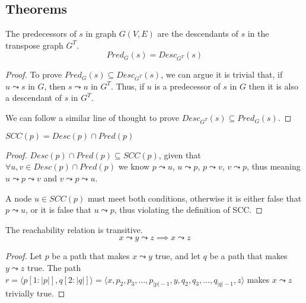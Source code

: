 \subsection{Theorems}
\begin{theorem}
    The predecessors of $s$ in graph $G(V,E)$ are the descendants of $s$ in the transpose graph $G^T$.
    \begin{equation*}
        Pred_{G}(s)=Desc_{G^T}(s)
    \end{equation*}
\end{theorem}
\begin{proof}
    To prove $Pred_G(s) \subseteq Desc_{G^T}(s)$, we can argue it is trivial that, if $u \leadsto s$ in $G$, then $s \leadsto u$ in $G^T$. Thus, if $u$ is a predecessor of $s$ in $G$ then it is also a descendant of $s$ in $G^T$.\par
    We can follow a similar line of thought to prove $Desc_{G^T}(s) \subseteq Pred_G(s)$.
\end{proof}
\begin{theorem} \label{teor:scc}
    $SCC(p)=Desc(p) \cap Pred(p)$
\end{theorem}
\begin{proof}
    $Desc(p) \cap Pred(p) \subseteq SCC(p)$, given that $\forall u, v \in Desc(p) \cap Pred(p)$ we know $p \leadsto u$, $u \leadsto p$, $p \leadsto v$, $v \leadsto p$, thus meaning $u \leadsto p \leadsto v$ and $v \leadsto p \leadsto u$.\par
    A node $u \in SCC(p)$ must meet both conditions, otherwise it is either false that $p \leadsto u$, or it is false that $u \leadsto p$, thus violating the definition of \acrshort{SCC}.
\end{proof}
\begin{theorem}
    The reachability relation is transitive.
    \begin{equation*}
        x \leadsto y \leadsto z \implies x \leadsto z
    \end{equation*}
\end{theorem}
\begin{proof}
Let $p$ be a path that makes $x \leadsto y$ true, and let $q$ be a path that makes $y \leadsto z$ true. The path $r = \langle p[1:|p|], q[2:|q|] \rangle = \langle x, p_2, p_3,...,p_{|p|-1},y,q_2,q_3,...,q_{|q|-1}, z \rangle$ makes $x \leadsto z$ trivially true.
\end{proof}
